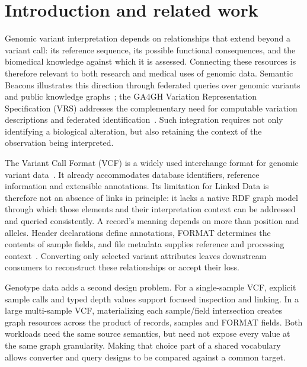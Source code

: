 \documentclass{ceurart}
\begin{document}
\section{Introduction and related work}

Genomic variant interpretation depends on relationships that extend beyond a variant call: its reference sequence, its possible functional consequences, and the biomedical knowledge against which it is assessed. Connecting these resources is therefore relevant to both research and medical uses of genomic data. Semantic Beacons illustrates this direction through federated queries over genomic variants and public knowledge graphs~\cite{bodrug2025semantic}; the GA4GH Variation Representation Specification (VRS) addresses the complementary need for computable variation descriptions and federated identification~\cite{wagner2021vrs}. Such integration requires not only identifying a biological alteration, but also retaining the context of the observation being interpreted.

The Variant Call Format (VCF) is a widely used interchange format for genomic variant data~\cite{danecek2011vcf}. It already accommodates database identifiers, reference information and extensible annotations. Its limitation for Linked Data is therefore not an absence of links in principle: it lacks a native RDF graph model through which those elements and their interpretation context can be addressed and queried consistently. A record's meaning depends on more than position and alleles. Header declarations define annotations, FORMAT determines the contents of sample fields, and file metadata supplies reference and processing context~\cite{vcf45}. Converting only selected variant attributes leaves downstream consumers to reconstruct these relationships or accept their loss.

Genotype data adds a second design problem. For a single-sample VCF, explicit sample calls and typed depth values support focused inspection and linking. In a large multi-sample VCF, materializing each sample/field intersection creates graph resources across the product of records, samples and FORMAT fields. Both workloads need the same source semantics, but need not expose every value at the same graph granularity. Making that choice part of a shared vocabulary allows converter and query designs to be compared against a common target.
\end{document}
